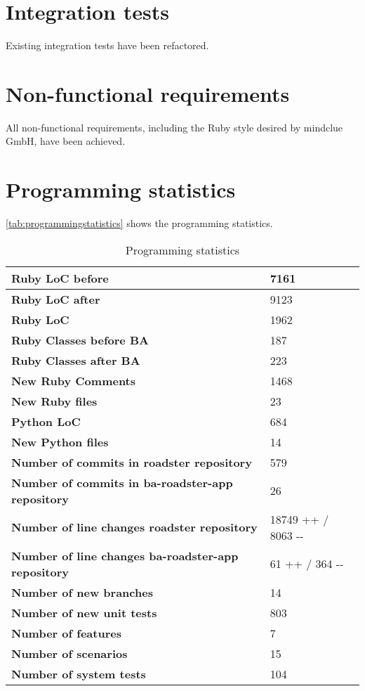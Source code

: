 \section{Integration tests}
Existing integration tests have been refactored.

\section{Non-functional requirements}
All non-functional requirements, including the Ruby style desired by mindclue
GmbH, have been achieved.


\section{Programming statistics}

\autoref{tab:programmingstatistics} shows the programming statistics.
\begin{table}[H]
  \centering
  \begin{tabular}{|m{50mm}|m{30mm}|}
   \hline
	\bf Ruby LoC before & 7161 \\
	\hline
	\bf Ruby LoC after & 9123 \\
	\hline
	\bf Ruby LoC & 1962 \\
	\hline
	\bf Ruby Classes before BA & 187 \\
	\hline
	\bf Ruby Classes after BA & 223 \\
	\hline
	\bf New Ruby Comments & 1468 \\
	\hline
	\bf New Ruby files & 23 \\
	\hline
	\bf Python LoC & 684 \\
	\hline
	\bf New Python files & 14 \\
	\hline
	\bf Number of commits in 
		\newline roadster repository & 579 \\
	\hline
	\bf Number of commits in 
		\newline ba-roadster-app repository & 26 \\
	\hline
	\bf Number of line changes 
		\newline roadster repository & 18749{\color{green!70} ++} / 8063{\color{red!70} -{}-} \\
	\hline
	\bf Number of line changes 
		\newline ba-roadster-app repository & 61{\color{green!70} ++} / 364{\color{red!70} -{}-} \\
	\hline
	\bf Number of new branches & 14 \\
	\hline
	\bf Number of new unit tests & 803 \\
	\hline
	\bf Number of features & 7 \\
	\hline
	\bf Number of scenarios & 15 \\
	\hline
	\bf Number of system tests & 104 \\
    \hline
  \end{tabular} \\
  \caption{Programming statistics}
  \label{tab:programmingstatistics}
\end{table}
